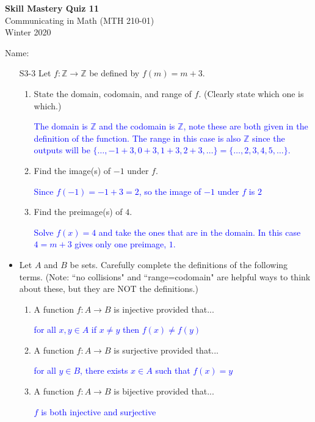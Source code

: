 \documentclass[10pt]{article}
\newcommand{\Z}{\mathbb{Z}}
\newcommand{\blue}{\textcolor{blue}}
\newcommand{\bs}{\begin{solution}}
\begin{document}
\vspace{-1.2in}
\begin{center} \textbf{\Large{Skill Mastery Quiz 11}} \\
Communicating in Math (MTH 210-01)\\
Winter 2020
\end{center}



\noindent Name: 




\begin{itemize}
	









\item[S3-3]  Let $f: \Z\to \Z$ be defined by $f(m) = m+3$.
		\begin{enumerate}
		\item State the domain, codomain, and range of $f$. (Clearly state which one is which.)
		\bs\blue{The domain is $\Z$ and the codomain is $\Z$, note these are both given in the definition of the function. The range in this case is also $\Z$ since the outputs will be $\{\dots, -1+3, 0+3,1+3,2+3,\dots\} = \{\dots, 2,3,4,5,\dots\}$.}\end{solution}
		\vspace{1in}
		\item Find the image(s) of $-1$ under $f$.
		\bs\blue{Since $f(-1) = -1+3 = 2$, so the image of $-1$ under $f$ is $2$}\end{solution}
		\vspace{1in}
		\item Find the preimage(s) of $4$.
		\bs\blue{Solve $f(x) = 4$ and take the ones that are in the domain. In this case $4=m+3$ gives only one preimage, $1$.}\end{solution}
		\vspace{1in}
		\end{enumerate} 


\item[S4-2] Let $A$ and $B$ be sets. Carefully complete the definitions of the following terms. (Note: ``no collisions" and ``range=codomain" are helpful ways to think about these, but they are NOT the definitions.)
		\begin{enumerate}
		\item  A function $f: A \to B$ is injective provided that...
		\bs\blue{for all $x,y\in A$ if $x\neq y$ then $f(x) \neq f(y)$}\end{solution}
		\vspace{1in}
		\item A function $f: A\to B$ is surjective provided that...
		\bs \blue{for all $y\in B$, there exists $x\in A$ such that $f(x)=y$}\end{solution}
		\vspace{1in}
		\item A function $f: A\to B$ is bijective provided that...
		\bs\blue{$f$ is both injective and surjective}\end{solution}
		\vspace{1in}
		\end{enumerate}



\end{itemize}
\end{document}
